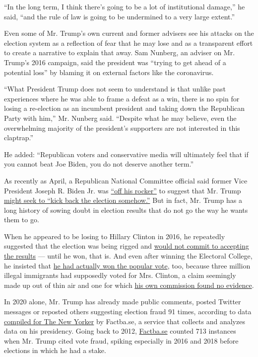 ``In the long term, I think there's going to be a lot of institutional
damage,'' he said, ``and the rule of law is going to be undermined to a
very large extent.''

Even some of Mr. Trump's own current and former advisers see his attacks
on the election system as a reflection of fear that he may lose and as a
transparent effort to create a narrative to explain that away. Sam
Nunberg, an adviser on Mr. Trump's 2016 campaign, said the president was
``trying to get ahead of a potential loss'' by blaming it on external
factors like the coronavirus.

``What President Trump does not seem to understand is that unlike past
experiences where he was able to frame a defeat as a win, there is no
spin for losing a re-election as an incumbent president and taking down
the Republican Party with him,'' Mr. Nunberg said. ``Despite what he may
believe, even the overwhelming majority of the president's supporters
are not interested in this claptrap.''

He added: ``Republican voters and conservative media will ultimately
feel that if you cannot beat Joe Biden, you do not deserve another
term.''

As recently as April, a Republican National Committee official said
former Vice President Joseph R. Biden Jr. was
\href{https://twitter.com/SteveGuest/status/1253796935011651587}{``off
his rocker''} to suggest that Mr. Trump
\href{https://www.nytimes.com/2020/04/24/us/politics/joseph-biden-trump-election.html?smid=tw-share}{might
seek to ``kick back the election somehow.''} But in fact, Mr. Trump has
a long history of sowing doubt in election results that do not go the
way he wants them to go.

When he appeared to be losing to Hillary Clinton in 2016, he repeatedly
suggested that the election was being rigged and
\href{https://www.nytimes.com/2016/10/20/us/politics/presidential-debate.html}{would
not commit to accepting the results} --- until he won, that is. And even
after winning the Electoral College, he insisted that
\href{https://www.nytimes.com/2016/11/27/us/politics/trump-adviser-steps-up-searing-attack-on-romney.html}{he
had actually won the popular vote}, too, because three million illegal
immigrants had supposedly voted for Mrs. Clinton, a claim seemingly made
up out of thin air and one for which
\href{https://www.nytimes.com/2018/01/03/us/politics/trump-voter-fraud-commission.html}{his
own commission found no evidence}.

In 2020 alone, Mr. Trump has already made public comments, posted
Twitter messages or reposted others suggesting election fraud 91 times,
according to data
\href{https://www.newyorker.com/news/letter-from-trumps-washington/trump-is-the-election-crisis-he-is-warning-about}{compiled
for The New Yorker} by Factba.se, a service that collects and analyzes
data on his presidency. Going back to 2012,
\href{https://factba.se/}{Factba.se} counted 713 instances when Mr.
Trump cited vote fraud, spiking especially in 2016 and 2018 before
elections in which he had a stake.

